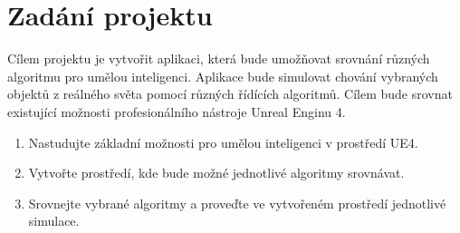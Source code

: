 \newpage 
\section{Zadání projektu}
Cílem projektu je vytvořit aplikaci, která bude umožňovat srovnání různých algoritmu pro umělou inteligenci. Aplikace bude simulovat chování vybraných objektů z reálného světa pomocí různých řídících algoritmů. Cílem bude srovnat existující možnosti profesionálního nástroje Unreal Enginu 4.

\begin{enumerate}
\item Nastudujte základní možnosti pro umělou inteligenci v prostředí UE4.
\item Vytvořte prostředí, kde bude možné jednotlivé algoritmy srovnávat.
\item Srovnejte vybrané algoritmy a proveďte ve vytvořeném prostředí jednotlivé simulace.
\end{enumerate}
